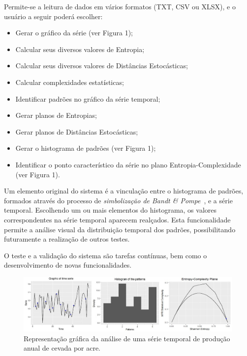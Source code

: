 \documentclass[12pt,letterpaper]{article}
\begin{document}
Permite-se a leitura de dados em vários formatos (TXT, CSV ou XLSX), e o usuário a seguir poderá escolher:

\begin{itemize}

	\item Gerar o gráfico da série (ver Figura 1);
	\item Calcular seus diversos valores de Entropia;
	\item Calcular seus diversos valores de Distâncias Estocásticas;
	\item Calcular complexidades estatísticas;
    \item Identificar padrões no gráfico da série temporal;
    \item Gerar planos de Entropias;
    \item Gerar planos de Distâncias Estocásticas;
	\item Gerar o histograma de padrões (ver Figura 1);
	\item Identificar o ponto característico da série no plano Entropia-Complexidade (ver Figura 1).

\end{itemize}

Um elemento original do sistema é a vinculação entre o histograma de padrões, formados através do processo de \textit{simbolização de Bandt \& Pompe}~\cite{PermutationEntropyBandtPompe}, e a série temporal. 
Escolhendo um ou mais elementos do histograma, os valores correspondentes na série temporal aparecem realçados. 
Esta funcionalidade permite a análise visual da distribuição temporal dos padrões, possibilitando futuramente a realização de outros testes.
 
O teste e a validação do sistema são tarefas contínuas, bem como o desenvolvimento de novas funcionalidades. 
  
\begin{figure}[!ht]
	\centering
	\includegraphics[width=1\columnwidth]{rplot}        
    \caption{Representação gráfica da análise de uma série temporal de produção anual de cevada por acre.}
\end{figure}
 
\end{document}
